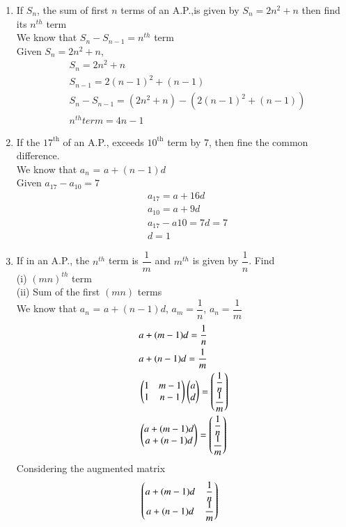 \documentclass[journal,12pt,twocolumn]{IEEEtran}
\renewcommand\thesection{\arabic{section}}
\begin{document}
\begin{enumerate}[label=\thesection.\arabic*.,ref=\thesection.\theenumi]
\item If $S_n$, the sum of first $n$ terms of an A.P.,is given by $S_n = 2n^2+n$ then find its $n^{th}$ term\\
\solution We know that $S_n - S_{n-1} = n^{th}$ term\\
Given $S_n = 2n^2+n$, 
\begin{align}
& S_n = 2n^2+n \nonumber \\
& S_{n-1} = 2(n-1)^2+(n-1) \nonumber \\
& S_n - S_{n-1} = (2n^2+n) - (2(n-1)^2+(n-1)) \nonumber \\
& n^{th} term = 4n-1 \nonumber
\end{align}
\item If the $17^{\text{th}}$ of an A.P., exceeds $10^{\text{th}}$ term by 7, then fine the common difference.  \\
\solution We know that $a_n$ = $a+(n-1)d$\\Given $a_{17} - a_{10} = 7$
\begin{align}
& a_{17} = a+16d \nonumber \\
& a_{10} = a+9d \nonumber \\
& a_{17} - a{10} = 7d = 7 \nonumber \\
& d =1 \nonumber
\end{align}
\item If in an A.P., the $n^{th}$ term is $\dfrac{1}{m}$ and $m^{th}$ is given by $\dfrac{1}{n}$. Find \\
(i) $(mn)^{th}$ term\\
(ii) Sum of the first $(mn)$ terms \\
\solution We know that $a_n$ = $a+(n-1)d$, $a_m = \dfrac{1}{n}$, $a_n = \dfrac{1}{m}$
\begin{align}
& a+(m-1)d = \dfrac{1}{n}  \label{1}\\
& a+(n-1)d = \dfrac{1}{m} \\ 
& \begin{pmatrix}1 & m-1 \\ 1 & n-1\end{pmatrix} \begin{pmatrix}a\\d\end{pmatrix} = \begin{pmatrix}\dfrac{1}{n} \\ \dfrac{1}{m}\end{pmatrix} \nonumber \\
& \begin{pmatrix}a+(m-1)d \\ a+(n-1)d\end{pmatrix} = \begin{pmatrix}\dfrac{1}{n} \\ \dfrac{1}{m}\end{pmatrix} \nonumber 
\end{align}
Considering the augmented matrix
\begin{align}
 & \myvec{a+(m-1)d&\dfrac{1}{n} \\ a+(n-1)d&\dfrac{1}{m}}& \nonumber \\

\end{align}
\end{enumerate}
\end{document}
